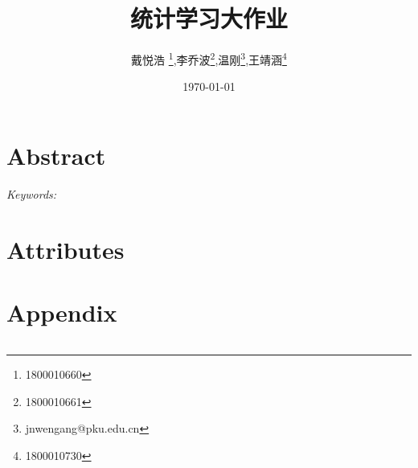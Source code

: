 \documentclass[AutoFakeBold,letterpaper,12pt,hidelinks]{article}
\title{统计学习大作业}
\begin{document}
\author{戴悦浩 \footnote{1800010660},李乔波\footnote{1800010661},温刚\footnote{jnwengang@pku.edu.cn},王靖涵\footnote{1800010730}
  }
\date{\today}
\maketitle

	
	\section{Abstract}

{\it Keywords:} \pagebreak
\tableofcontents
\pagebreak
\section{Attributes}%


\section{Appendix}%

\begin{lstlisting}[language=matlab]
\end{lstlisting}



	
\end{document}
